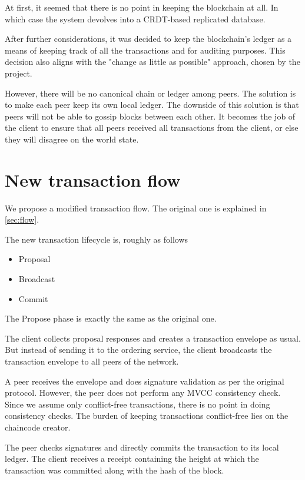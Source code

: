 At first, it seemed that there is no point in keeping the blockchain at all. In which case the system devolves into a CRDT-based replicated database.

After further considerations, it was decided to keep the blockchain's ledger as a means of keeping track of all the transactions and for auditing purposes. This decision also aligns with the "change as little as possible" approach, chosen by the project.

However, there will be no canonical chain or ledger among peers. The solution is to make each peer keep its own local ledger. The downside of this solution is that peers will not be able to gossip blocks between each other. It becomes the job of the client to ensure that all peers received all transactions from the client, or else they will disagree on the world state.

\section{New transaction flow}
\label{sec:app-flow}

We propose a modified transaction flow. The original one is explained in \ref{sec:flow}.

The new transaction lifecycle is, roughly as follows

\begin{itemize}
  \item Proposal
  \item Broadcast
  \item Commit
\end{itemize}

The Propose phase is exactly the same as the original one.

The client collects proposal responses and creates a transaction envelope as usual. But instead of sending it to the ordering service, the client broadcasts the transaction envelope to all peers of the network.

A peer receives the envelope and does signature validation as per the original protocol. However, the peer does not perform any MVCC consistency check. Since we assume only conflict-free transactions, there is no point in doing consistency checks. The burden of keeping transactions conflict-free lies on the chaincode creator.

The peer checks signatures and directly commits the transaction to its local ledger. The client receives a receipt containing the height at which the transaction was committed along with the hash of the block.

